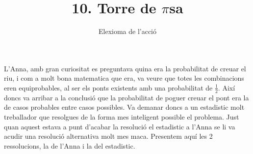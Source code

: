 \documentclass[12pt, a4papre]{article}
\author{Elexioma de l'acció}
\title{10. Torre de $\pi$sa}
\date{}
\begin{document}
	\maketitle

	L'Anna, amb gran curiositat es preguntava quina era la probabilitat de creuar el riu, i com a molt bona matematica que era, va veure que totes les combinacions eren equiprobables, al ser els ponts existents amb una probabilitat de $\frac{1}{2}$. Així doncs va arribar a la conclusió que la probabilitat de poguer creuar el pont era la de casos probables entre casos possibles. Va demanar doncs a un estadistic molt treballador que resolgues de la forma mes inteligent possible el problema. Just quan aquest estava a punt d'acabar la resolució el estadistic a l'Anna se li va acudir una resolució alternativa molt mes maca. Presentem aquí les 2 ressolucions, la de l'Anna i la del estadistic.
	
\end{document}

